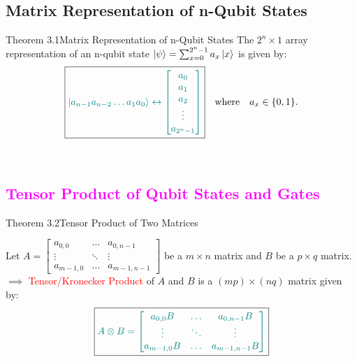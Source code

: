 \documentclass{book}
\begin{document}
\subsection{Matrix Representation of n-Qubit States}
\begin{thmBox}{Theorem 3.1}{Matrix Representation of n-Qubit States}
    The $2^n \times 1$ array representation of an n-qubit state $\ket{\psi} = \sum_{x=0}^{2^n-1} a_x\ket{x}$ is given by:
    \[
        \boxed{\textcolor{teal}{\ket{a_{n-1}a_{n-2}\ldots a_1a_0} \leftrightarrow \begin{bmatrix} a_0 \\ a_1 \\ a_2 \\ \vdots \\ a_{2^n-1} \end{bmatrix}}} \quad \text{where} \quad a_x \in \{0, 1\}.
    \]
\end{thmBox}
\\
\textcolor{magenta}{\section{\textbf{Tensor Product of Qubit States and Gates}}}
\begin{thmBox}{Theorem 3.2}{Tensor Product of Two Matrices}
    \raggedright
    Let $A = \begin{bmatrix} a_{0,0} & \ldots & a_{0,n-1} \\ \vdots & \ddots & \vdots \\ a_{m-1,0} & \ldots & a_{m-1,n-1} \end{bmatrix}$ be a $m \times n$ matrix and $B$ be a $p \times q$ matrix.\\
    \vspace{2mm}
    $\implies$ \textcolor{red}{Tensor/Kronecker Product} of $A$ and $B$ is a $(mp) \times (nq)$ matrix given by:
    \[
        \boxed{\textcolor{teal}{A \otimes B = \begin{bmatrix} a_{0,0}B & \ldots & a_{0,n-1}B \\ \vdots & \ddots & \vdots \\ a_{m-1,0}B & \ldots & a_{m-1,n-1}B \end{bmatrix}}}
    \]
\end{thmBox}
\end{document}
